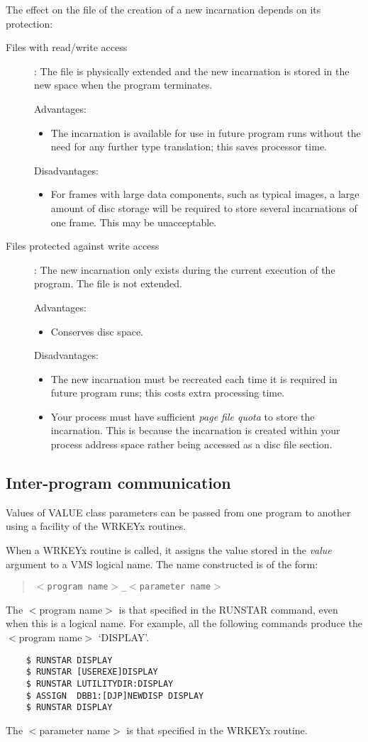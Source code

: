 The effect on the file of the creation of a new incarnation depends on its
protection:
\begin{description}
\item [Files with read/write access]:
The file is physically extended and the new incarnation is stored in the
new space when the program terminates.

Advantages:
\begin{itemize}
\item The incarnation is available for use in future program runs without the need
for any further type translation; this saves processor time.
\end{itemize}
Disadvantages:
\begin{itemize}
\item For frames with large data components, such as typical images, a large
amount of disc storage will be required to store several incarnations of one
frame.
This may be unacceptable.
\end{itemize}
\item [Files protected against write access]:
The new incarnation only exists during the current execution of the program.
The file is not extended.

Advantages:
\begin{itemize}
\item Conserves disc space.
\end{itemize}
Disadvantages:
\begin{itemize}
\item The new incarnation must be recreated each time it is required in future
program runs; this costs extra processing time.
\item Your process must have sufficient {\em page file quota} to store the
incarnation.
This is because the incarnation is created within your process address space
rather being accessed as a disc file section.
\end{itemize}
\end{description}
\subsection {Inter-program communication}
Values of VALUE class parameters can be passed from one program to another
using a facility of the WRKEYx routines.

When a WRKEYx routine is called, it assigns the value stored in the {\em value}
argument to a VMS logical name.
The name constructed is of the form:
\begin{quote}
{\tt $<$program name$>$\_$<$parameter name$>$}
\end{quote}
The $<$program name$>$ is that specified in the RUNSTAR command, even when this
is a logical name.
For example, all the following commands produce the $<$program name$>$
`DISPLAY'.
\begin{verbatim}
    $ RUNSTAR DISPLAY
    $ RUNSTAR [USEREXE]DISPLAY
    $ RUNSTAR LUTILITYDIR:DISPLAY
    $ ASSIGN  DBB1:[DJP]NEWDISP DISPLAY
    $ RUNSTAR DISPLAY
\end{verbatim}
The $<$parameter name$>$ is that specified in the WRKEYx routine.

